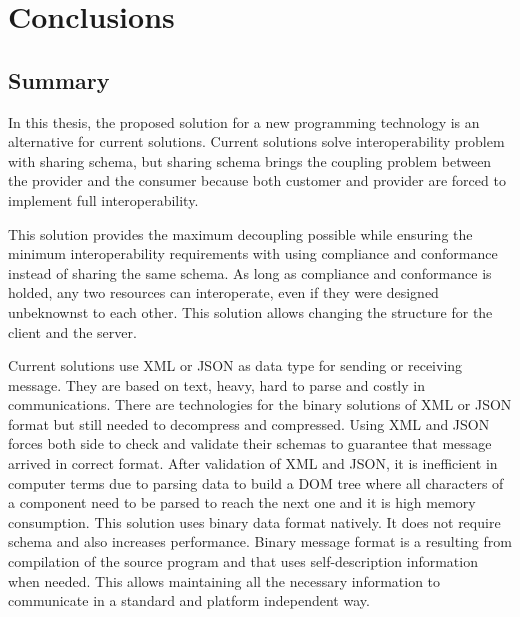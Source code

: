 
\chapter{Conclusions}
\label{chapter:conclusions}

\section{Summary}
\label{section:summary}

In this thesis, the proposed solution for a new programming technology is an alternative for current solutions. Current solutions solve interoperability problem with sharing schema, but sharing schema brings the coupling problem between the provider and the consumer because both customer and provider are forced to implement full interoperability.

This solution provides the maximum decoupling possible while ensuring the minimum interoperability requirements with using compliance and conformance instead of sharing the same schema. As long as compliance and conformance is holded, any two resources can interoperate, even if they were designed unbeknownst to each other. This solution allows changing the structure for the client and the server.

Current solutions use XML or JSON as data type for sending or receiving message. They are based on text, heavy, hard to parse and costly in communications. There are technologies for the binary solutions of XML or JSON format but still needed to decompress and compressed. Using XML and JSON forces both side to check and validate their schemas to guarantee that message arrived in correct format. After validation of XML and JSON, it is inefficient in computer terms due to parsing data to build a DOM tree where all characters of a component need to be parsed to reach the next one and it is high memory consumption. This solution uses binary data format natively. It does not require schema and also increases performance. Binary message format is a resulting from compilation of the source program and that uses self-description information when needed. This allows maintaining all the necessary information to communicate in a standard and platform independent way.

